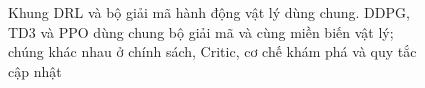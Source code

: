 \begin{figure}[htbp]
\centering
\resizebox{0.95\textwidth}{!}{}
\caption[Khung DRL và bộ giải mã hành động vật lý dùng chung]{Khung DRL và bộ giải mã hành động vật lý dùng chung. DDPG, TD3 và PPO dùng chung bộ giải mã và cùng miền biến vật lý; chúng khác nhau ở chính sách, Critic, cơ chế khám phá và quy tắc cập nhật}
\label{fig:ch3-khung-drl}
\end{figure}
